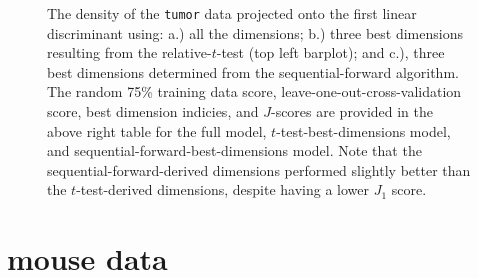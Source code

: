 \begin{figure}[H]
  \caption{The density of the \texttt{tumor} data projected onto the first linear discriminant using: a.) all the dimensions; b.) three best dimensions resulting from the relative-$t$-test (top left barplot); and c.), three best dimensions determined from the sequential-forward algorithm.  The random 75\% training data score, leave-one-out-cross-validation score, best dimension indicies, and $J$-scores are provided in the above right table for the full model, $t$-test-best-dimensions model, and sequential-forward-best-dimensions model.   Note that the sequential-forward-derived dimensions performed slightly better than the $t$-test-derived dimensions, despite having a lower $J_1$ score.}
\end{figure}

\section{mouse data}

